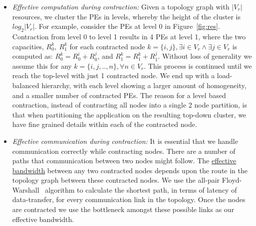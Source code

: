 \begin{itemize}

\item \textit{Effective computation during contraction:} Given a
  topology graph with $|V_r|$ resources, we cluster the PEs in levels,
  whereby the height of the cluster is $log_2|V_r|$. For example,
  consider the PEs at level 0 in Figure~\ref{fig:res}. Contraction from
  level 0 to level 1 results in 4 PEs at level 1, where the two
  capacities, $R^k_0,\ R^k_1$ for each contracted node $k = \{i, j\},
  \exists i \in V_r \wedge \exists j \in V_r$ is computed as: $R^k_0 =
  R^i_0 + R^j_0$, and $R^k_1 = R^k_1 + R^j_1$. Without loss of
  generality we assume this for any $k = \{i,j,..,n\}, \forall n \in
  V_r$. This process is continued until we reach the top-level with just
  1 contracted node. We end up with a load-balanced hierarchy, with each
  level showing a larger amount of homogeneity, and a smaller number of
  contracted PEs. The reason for a level based contraction, instead of
  contracting all nodes into a single 2 node partition, is that when
  partitioning the application on the resulting top-down cluster, we
  have fine grained details within each of the contracted node.



\item \textit{Effective communication during contraction:} It is
  essential that we handle communication correctly while contracting
  nodes. There are a number of paths that communication between two
  nodes might follow. The \underline{effective bandwidth} between any
  two contracted nodes depends upon the route in the topology graph
  between these contracted nodes. We use the all-pair
  Floyd-Warshall~\cite{sski08} algorithm to calculate the shortest path,
  in terms of latency of data-transfer, for every communication link
  in the topology. Once the nodes are contracted we use the bottleneck
  amongst these possible links as our effective bandwidth.


\end{itemize}
